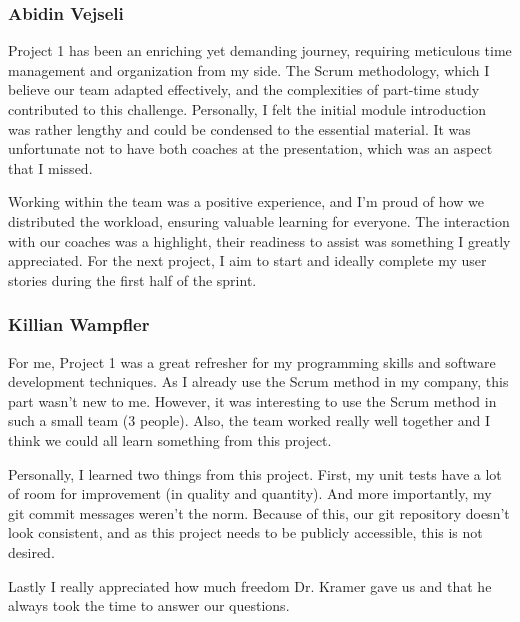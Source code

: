 \subsubsection{Abidin Vejseli}
Project 1 has been an enriching yet demanding journey, requiring meticulous time management and organization from my side.
The Scrum methodology, which I believe our team adapted effectively, and the complexities of part-time study contributed to this challenge.
Personally, I felt the initial module introduction was rather lengthy and could be condensed to the essential material.
It was unfortunate not to have both coaches at the presentation, which was an aspect that I missed.

Working within the team was a positive experience, and I'm proud of how we distributed the workload, ensuring valuable learning for everyone.
The interaction with our coaches was a highlight, their readiness to assist was something I greatly appreciated.
For the next project, I aim to start and ideally complete my user stories during the first half of the sprint.

\subsubsection{Killian Wampfler}
For me, Project 1 was a great refresher for my programming skills and software development techniques.
As I already use the Scrum method in my company, this part wasn't new to me.
However, it was interesting to use the Scrum method in such a small team (3 people).
Also, the team worked really well together and I think we could all learn something from this project.

Personally, I learned two things from this project.
First, my unit tests have a lot of room for improvement (in quality and quantity).
And more importantly, my git commit messages weren't the norm.
Because of this, our git repository doesn't look consistent, and as this project needs to be publicly accessible, this is not desired.

Lastly I really appreciated how much freedom Dr. Kramer gave us and that he always took the time to answer our questions.
